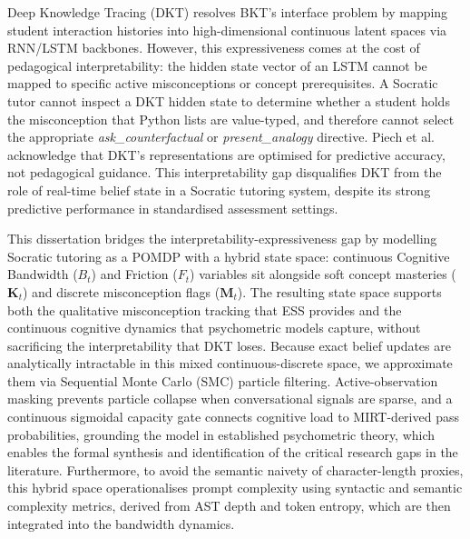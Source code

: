 \documentclass[11pt,a4paper]{report}
\begin{document}
Deep Knowledge Tracing (DKT) \cite{piech2015deep} resolves BKT's interface problem by mapping student interaction histories into high-dimensional continuous latent spaces via RNN/LSTM backbones. However, this expressiveness comes at the cost of pedagogical interpretability: the hidden state vector of an LSTM cannot be mapped to specific active misconceptions or concept prerequisites. A Socratic tutor cannot inspect a DKT hidden state to determine whether a student holds the misconception that Python lists are value-typed, and therefore cannot select the appropriate \textit{ask\_counterfactual} or \textit{present\_analogy} directive. Piech et al.\ \cite{piech2015deep} acknowledge that DKT's representations are optimised for predictive accuracy, not pedagogical guidance. This interpretability gap disqualifies DKT from the role of real-time belief state in a Socratic tutoring system, despite its strong predictive performance in standardised assessment settings.

This dissertation bridges the interpretability-expressiveness gap by modelling Socratic tutoring as a POMDP with a hybrid state space: continuous Cognitive Bandwidth ($B_t$) and Friction ($F_t$) variables sit alongside soft concept masteries ($\mathbf{K}_t$) and discrete misconception flags ($\mathbf{M}_t$). The resulting state space supports both the qualitative misconception tracking that ESS provides and the continuous cognitive dynamics that psychometric models capture, without sacrificing the interpretability that DKT loses. Because exact belief updates are analytically intractable in this mixed continuous-discrete space, we approximate them via Sequential Monte Carlo (SMC) particle filtering. Active-observation masking prevents particle collapse when conversational signals are sparse, and a continuous sigmoidal capacity gate connects cognitive load to MIRT-derived pass probabilities, grounding the model in established psychometric theory, which enables the formal synthesis and identification of the critical research gaps in the literature. Furthermore, to avoid the semantic naivety of character-length proxies, this hybrid space operationalises prompt complexity using syntactic and semantic complexity metrics, derived from AST depth and token entropy, which are then integrated into the bandwidth dynamics.
\end{document}

